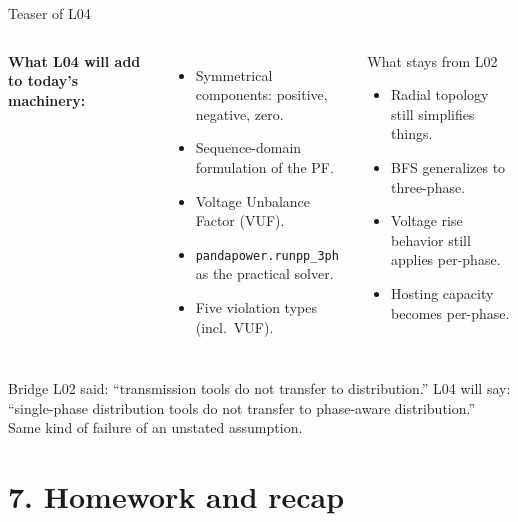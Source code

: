 \documentclass[aspectratio=169,10pt]{beamer}
\newcommand{\code}[1]{\texttt{#1}}
\begin{document}
\begin{frame}{Teaser of L04}
\begin{columns}[T]
\textbf{What L04 will add to today's machinery:}
\begin{itemize}
  \item Symmetrical components: positive, negative, zero.
  \item Sequence-domain formulation of the PF.
  \item Voltage Unbalance Factor (VUF).
  \item \code{pandapower.runpp\_3ph} as the practical solver.
  \item Five violation types (incl.\ VUF).
\end{itemize}
\begin{block}{What stays from L02}
\begin{itemize}
  \item Radial topology still simplifies things.
  \item BFS generalizes to three-phase.
  \item Voltage rise behavior still applies per-phase.
  \item Hosting capacity becomes per-phase.
\end{itemize}
\end{block}
\end{columns}
\vspace{0.5em}
\begin{block}{Bridge}
L02 said: ``transmission tools do not transfer to distribution.'' L04 will say: ``single-phase distribution tools do not transfer to phase-aware distribution.'' Same kind of failure of an unstated assumption.
\end{block}
\end{frame}

\section*{7. Homework and recap}
\end{document}
